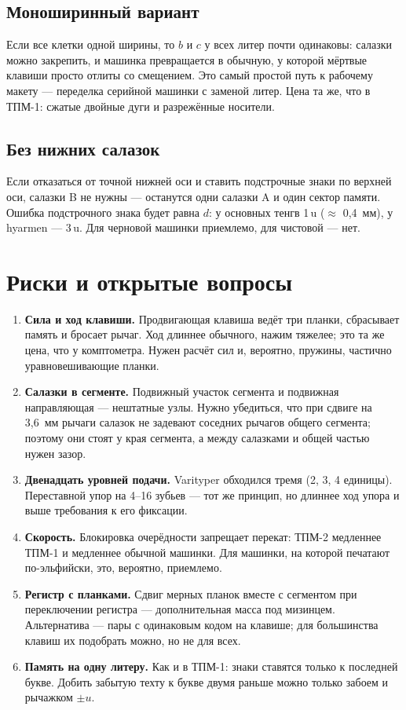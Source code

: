 \subsection*{Моноширинный вариант}

Если все клетки одной ширины, то $b$ и $c$ у всех литер почти одинаковы: салазки можно закрепить, и машинка превращается в обычную, у которой мёртвые клавиши просто отлиты со смещением. Это самый простой путь к рабочему макету — переделка серийной машинки с заменой литер. Цена та же, что в ТПМ-1: сжатые двойные дуги и разрежённые носители.

\subsection*{Без нижних салазок}

Если отказаться от точной нижней оси и ставить подстрочные знаки по верхней оси, салазки B не нужны — останутся одни салазки A и один сектор памяти. Ошибка подстрочного знака будет равна $d$: у основных тенгв 1\,u ($\approx$ 0,4~мм), у hyarmen — 3\,u. Для черновой машинки приемлемо, для чистовой — нет.

\section{Риски и открытые вопросы}

\begin{enumerate}[label=Р\arabic*.]
  \item \textbf{Сила и ход клавиши.} Продвигающая клавиша ведёт три планки, сбрасывает память и бросает рычаг. Ход длиннее обычного, нажим тяжелее; это та же цена, что у комптометра. Нужен расчёт сил и, вероятно, пружины, частично уравновешивающие планки.
  \item \textbf{Салазки в сегменте.} Подвижный участок сегмента и подвижная направляющая — нештатные узлы. Нужно убедиться, что при сдвиге на 3,6~мм рычаги салазок не задевают соседних рычагов общего сегмента; поэтому они стоят у края сегмента, а между салазками и общей частью нужен зазор.
  \item \textbf{Двенадцать уровней подачи.} Varityper обходился тремя (2, 3, 4 единицы). Переставной упор на 4--16 зубьев — тот же принцип, но длиннее ход упора и выше требования к его фиксации.
  \item \textbf{Скорость.} Блокировка очерёдности запрещает перекат: ТПМ-2 медленнее ТПМ-1 и медленнее обычной машинки. Для машинки, на которой печатают по-эльфийски, это, вероятно, приемлемо.
  \item \textbf{Регистр с планками.} Сдвиг мерных планок вместе с сегментом при переключении регистра — дополнительная масса под мизинцем. Альтернатива — пары с одинаковым кодом на клавише; для большинства клавиш их подобрать можно, но не для всех.
  \item \textbf{Память на одну литеру.} Как и в ТПМ-1: знаки ставятся только к последней букве. Добить забытую техту к букве двумя раньше можно только забоем и рычажком $\pm u$.
\end{enumerate}

